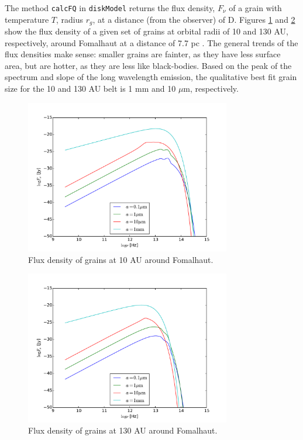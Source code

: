 \documentclass[12pt,preprint]{aastex}
\begin{document}
The method \texttt{calcFQ} in \texttt{diskModel} returns the flux density, $F_\nu$ of a grain with temperature $T$, radius $r_g$, at a distance (from the observer) of D. Figures \ref{fig:Fnu10AU} and \ref{fig:Fnu130AU} show the flux density of a given set of grains at orbital radii of 10 and 130 AU, respectively, around Fomalhaut at a distance of 7.7 pc \cite{Fom}. The general trends of the flux densities make sense: smaller grains are fainter, as they have less surface area, but are hotter, as they are less like black-bodies. Based on the peak of the spectrum and slope of the long wavelength emission, the qualitative best fit grain size for the 10 and 130 AU belt is 1 mm and 10 $\mu$m, respectively.


\begin{figure}[htbp]
\begin{center}
\includegraphics[width=0.8\textwidth]{Fnu10AU.pdf}
    \caption{Flux density of grains at 10 AU around Fomalhaut.}
    \label{fig:Fnu10AU}
\end{center}
\end{figure}

\begin{figure}[htbp]
\begin{center}
\includegraphics[width=0.8\textwidth]{Fnu130AU.pdf}
    \caption{Flux density of grains at 130 AU around Fomalhaut.}
    \label{fig:Fnu130AU}
\end{center}
\end{figure}
\end{document}
